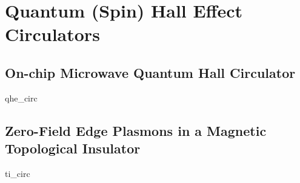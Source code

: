 \chapter{Quantum (Spin) Hall Effect Circulators}

\clearpage
\section{On-chip Microwave Quantum Hall Circulator}
{qhe_circ}

\clearpage
\section{Zero-Field Edge Plasmons in a Magnetic Topological Insulator}
{ti_circ}
